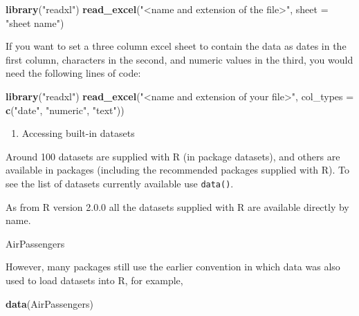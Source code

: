 \documentclass[]{book}
\newenvironment{Shaded}{\begin{snugshade}}{\end{snugshade}}
\newcommand{\KeywordTok}[1]{\textcolor[rgb]{0.13,0.29,0.53}{\textbf{#1}}}
\newcommand{\DataTypeTok}[1]{\textcolor[rgb]{0.13,0.29,0.53}{#1}}
\newcommand{\StringTok}[1]{\textcolor[rgb]{0.31,0.60,0.02}{#1}}
\newcommand{\NormalTok}[1]{#1}
\providecommand{\tightlist}{%
  \setlength{\itemsep}{0pt}\setlength{\parskip}{0pt}}
\begin{document}
\begin{Shaded}
\begin{Highlighting}[]
\KeywordTok{library}\NormalTok{(}\StringTok{"readxl"}\NormalTok{)}
\KeywordTok{read_excel}\NormalTok{(}\StringTok{"<name and extension of the file>"}\NormalTok{, }\DataTypeTok{sheet =} \StringTok{"sheet name"}\NormalTok{) }
\end{Highlighting}
\end{Shaded}

If you want to set a three column excel sheet to contain the data as
dates in the first column, characters in the second, and numeric values
in the third, you would need the following lines of code:

\begin{Shaded}
\begin{Highlighting}[]
\KeywordTok{library}\NormalTok{(}\StringTok{"readxl"}\NormalTok{)}
\KeywordTok{read_excel}\NormalTok{(}\StringTok{"<name and extension of your file>"}\NormalTok{,}
           \DataTypeTok{col_types =} \KeywordTok{c}\NormalTok{(}\StringTok{"date"}\NormalTok{, }\StringTok{"numeric"}\NormalTok{, }\StringTok{"text"}\NormalTok{))}
\end{Highlighting}
\end{Shaded}

\begin{enumerate}
\def\labelenumi{\arabic{enumi}.}
\setcounter{enumi}{4}
\tightlist
\item
  Accessing built-in datasets
\end{enumerate}

Around 100 datasets are supplied with R (in package datasets), and
others are available in packages (including the recommended packages
supplied with R). To see the list of datasets currently available use
\texttt{data()}.

As from R version 2.0.0 all the datasets supplied with R are available
directly by name.

\begin{Shaded}
\begin{Highlighting}[]
\NormalTok{AirPassengers}
\end{Highlighting}
\end{Shaded}

However, many packages still use the earlier convention in which data
was also used to load datasets into R, for example,

\begin{Shaded}
\begin{Highlighting}[]
\KeywordTok{data}\NormalTok{(AirPassengers)}
\end{Highlighting}
\end{Shaded}
\end{document}
